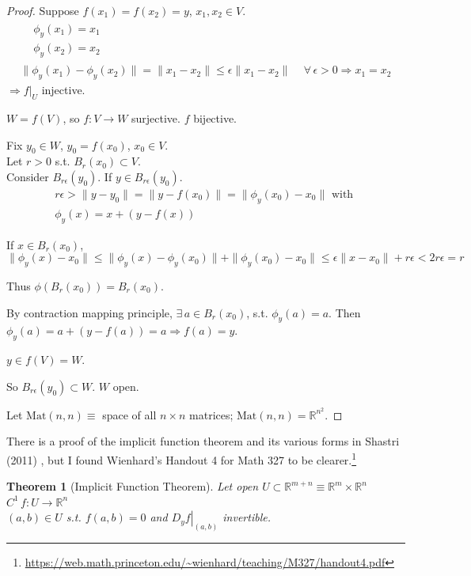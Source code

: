\documentclass[10pt]{amsart}
\newtheorem{theorem}{Theorem}
\begin{document}
\begin{multicols*}{2}
\begin{proof}
Suppose $f(x_1) = f(x_2)=y$, $x_1,x_2 \in V$.  
\[
\begin{gathered}
\begin{aligned}
  & \phi_y(x_1) =x_1 \\ 
  & \phi_y(x_2) =x_2  
\end{aligned} \\
\| \phi_y(x_1) - \phi_y(x_2) \| = \| x_1 - x_2 \| \leq \epsilon \| x_1 - x_2 \| \quad \, \forall \, \epsilon > 0 \Longrightarrow x_1 = x_2 
\end{gathered}
\]
$\Longrightarrow \left. f\right|_U$ injective.

$W=f(V)$, so $f:V\to W$ surjective.  $f$ bijective.  

Fix $y_0 \in W$, $y_0 = f(x_0)$, $x_0 \in V$.  \\
Let $r>0$ s.t. $B_r(x_0) \subset V$.  \\
Consider $B_{r\epsilon}(y_0)$.  If $y\in B_{r\epsilon}(y_0)$.  
\[
\begin{gathered}
  r\epsilon > \| y-y_0 \| = \| y - f(x_0) \| = \| \phi_y(x_0) - x_0 \| \text{ with } \\
  \phi_y(x) = x + (y-f(x))
\end{gathered}
\]

If $x\in B_r(x_0)$, 
\[
\| \phi_y(x) -x_0 \| \leq \| \phi_y(x) - \phi_y(x_0) \|  + \| \phi_y(x_0) - x_0 \| \leq \epsilon \| x-x_0 \| + r\epsilon < 2 r\epsilon = r
\]


Thus $\phi(B_r(x_0)) = B_r(x_0)$.

By contraction mapping principle, $\exists \, a \in B_r(x_0)$, s.t. $\phi_y(a)=a$.  Then $\phi_y(a) = a+ (y-f(a)) = a \Longrightarrow f(a) =y$.  

$y\in f(V) = W$.  

So $B_{r\epsilon}(y_0) \subset W$.  $W$ open.  

Let $\text{Mat}(n,n) \equiv $ space of all $n\times n$ matrices; $\text{Mat}(n,n)  = \mathbb{R}^{n^2}$.  


\end{proof}

There is a proof of the implicit function theorem and its various forms in Shastri (2011) \cite{AShastri2011}, but I found Wienhard's Handout 4 for Math 327 to be clearer.\footnote{\url{https://web.math.princeton.edu/~wienhard/teaching/M327/handout4.pdf}}

\begin{theorem}[Implicit Function Theorem]
Let open $U \subset \mathbb{R}^{m+n} \equiv \mathbb{R}^m \times \mathbb{R}^n$  \\
\phantom{Let} $C^1 \, f:U \to \mathbb{R}^n $ \\
\phantom{Let} $(a,b) \in U$ s.t. $f(a,b) = 0$ and $\left. D_y f\right|_{(a,b)}$ invertible.  


\end{theorem}
\end{multicols*}
\end{document}
